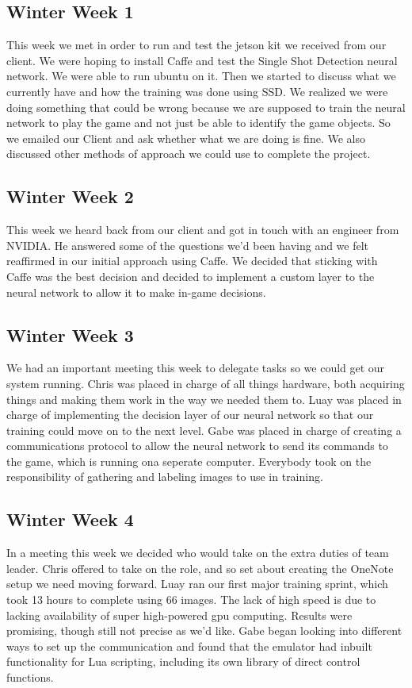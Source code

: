 \documentclass[onecolumn, draftclsnofoot,10pt, compsoc]{IEEEtran}
\begin{document}
\subsection{Winter Week 1}
This week we met in order to run and test the jetson kit we received from our client.
We were hoping to install Caffe and test the Single Shot Detection neural network. 
We were able to run ubuntu on it. 
Then we started to discuss what we currently have and how the training was done using SSD. 
We realized we were doing something that could be wrong because we are supposed to train the neural network to play the game and not just be able to identify the game objects. 
So we emailed our Client and ask whether what we are doing is fine. 
We also discussed other methods of approach we could use to complete the project.

\subsection{Winter Week 2}
This week we heard back from our client and got in touch with an engineer from NVIDIA. 
He answered some of the questions we'd been having and we felt reaffirmed in our initial approach using Caffe.
We decided that sticking with Caffe was the best decision and decided to implement a custom layer to the neural network to allow it to make in-game decisions.

\subsection{Winter Week 3}
We had an important meeting this week to delegate tasks so we could get our system running. 
Chris was placed in charge of all things hardware, both acquiring things and making them work in the way we needed them to.
Luay was placed in charge of implementing the decision layer of our neural network so that our training could move on to the next level.
Gabe was placed in charge of creating a communications protocol to allow the neural network to send its commands to the game, which is running ona seperate computer.
Everybody took on the responsibility of gathering and labeling images to use in training.

\subsection{Winter Week 4}
In a meeting this week we decided who would take on the extra duties of team leader. 
Chris offered to take on the role, and so set about creating the OneNote setup we need moving forward.
Luay ran our first major training sprint, which took 13 hours to complete using 66 images. 
The lack of high speed is due to lacking availability of super high-powered gpu computing. 
Results were promising, though still not precise as we'd like.
Gabe began looking into different ways to set up the communication and found that the emulator had inbuilt functionality for Lua scripting, including its own library of direct control functions.
\end{document}
